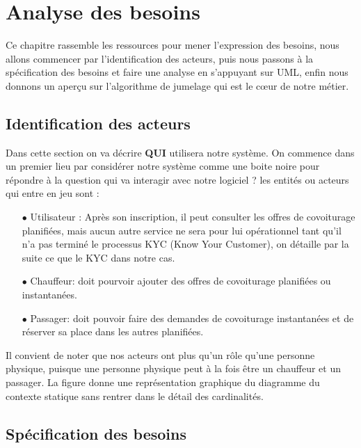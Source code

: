 \chapter{Analyse des besoins}
Ce chapitre rassemble les ressources pour mener l'expression des besoins, nous allons commencer par l'identification des acteurs, puis nous passons à la spécification des besoins et faire une analyse en s'appuyant sur UML, enfin nous donnons un aperçu sur l'algorithme de jumelage qui est le cœur de notre métier.
\section{Identification des acteurs}
Dans cette section on va décrire \textbf{QUI} utilisera notre système. On commence dans un premier lieu par considérer notre système comme une boite noire pour répondre à la question qui va interagir avec notre logiciel ?\newline
les entités ou acteurs qui entre en jeu sont :
\begin{itemize}
	\item[$\bullet$] Utilisateur : Après son inscription, il peut consulter les offres de covoiturage planifiées, mais aucun autre service ne sera pour lui opérationnel tant qu'il n'a pas terminé le processus KYC (Know Your Customer), on détaille par la suite ce que le KYC dans notre cas.
	\item[$\bullet$] Chauffeur: doit pourvoir ajouter des offres de covoiturage planifiées ou instantanées.
	\item[$\bullet$] Passager: doit pouvoir faire des demandes de covoiturage instantanées et de réserver sa place dans les autres planifiées.
\end{itemize}
Il convient de noter que nos acteurs ont plus qu'un rôle qu'une personne physique, puisque une personne physique peut à la fois être un chauffeur et un passager.\newline
La figure  donne une représentation graphique du diagramme du contexte statique sans rentrer dans le détail des cardinalités.

\section{Spécification des besoins}
